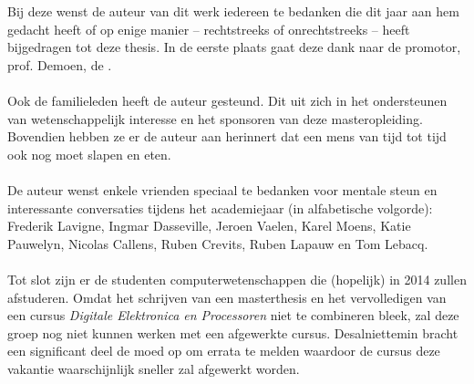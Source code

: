 \documentclass[master=cws,masteroption=ai]{kulemt}
\begin{document}
\begin{preface}
  Bij deze wenst de auteur van dit werk iedereen te bedanken die dit jaar aan hem gedacht heeft of op enige manier -- rechtstreeks of onrechtstreeks -- heeft bijgedragen tot deze thesis. In de eerste plaats gaat deze dank naar de promotor, prof. Demoen, de .
  \paragraph{}
  Ook de familieleden heeft de auteur gesteund. Dit uit zich in het ondersteunen van wetenschappelijk interesse en het sponsoren van deze masteropleiding. Bovendien hebben ze er de auteur aan herinnert dat een mens van tijd tot tijd ook nog moet slapen en eten.
  \paragraph{}
  De auteur wenst enkele vrienden speciaal te bedanken voor mentale steun en interessante conversaties tijdens het academiejaar (in alfabetische volgorde): \nohyphens{Frederik Lavigne, Ingmar Dasseville, Jeroen Vaelen, Karel Moens, Katie Pauwelyn, Nicolas Callens, Ruben Crevits, Ruben Lapauw en Tom Lebacq}.
  \paragraph{}
  Tot slot zijn er de studenten computerwetenschappen die (hopelijk) in 2014 zullen afstuderen. Omdat het schrijven van een masterthesis en het vervolledigen van een cursus \emph{Digitale Elektronica en Processoren} niet te combineren bleek, zal deze groep nog niet kunnen werken met een afgewerkte cursus. Desalniettemin bracht een significant deel de moed op om errata te melden waardoor de cursus deze vakantie waarschijnlijk sneller zal afgewerkt worden.
\end{preface}



\mainmatter



\appendixpage*          %
\appendix


\backmatter
\begin{multicols}{2}


\end{multicols}
\end{document}
